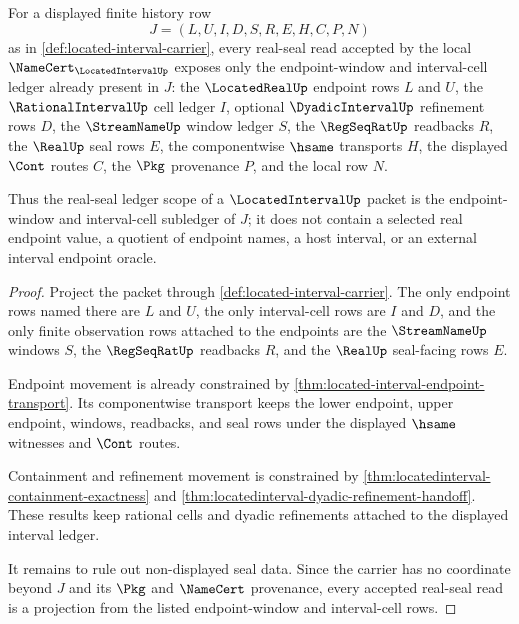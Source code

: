 \begin{theorem}
\label{thm:locatedinterval-real-seal-ledger-scope}
For a displayed finite history row
$$
J=(L,U,I,D,S,R,E,H,C,P,N)
$$
as in \autoref{def:located-interval-carrier}, every real-seal read accepted by the local $\NameCert_{\LocatedIntervalUp}$ exposes only the endpoint-window and interval-cell ledger already present in $J$: the $\LocatedRealUp$ endpoint rows $L$ and $U$, the $\RationalIntervalUp$ cell ledger $I$, optional $\DyadicIntervalUp$ refinement rows $D$, the $\StreamNameUp$ window ledger $S$, the $\RegSeqRatUp$ readbacks $R$, the $\RealUp$ seal rows $E$, the componentwise $\hsame$ transports $H$, the displayed $\Cont$ routes $C$, the $\Pkg$ provenance $P$, and the local row $N$.

Thus the real-seal ledger scope of a $\LocatedIntervalUp$ packet is the endpoint-window and interval-cell subledger of $J$; it does not contain a selected real endpoint value, a quotient of endpoint names, a host interval, or an external interval endpoint oracle.
\end{theorem}
\begin{proof}
Project the packet through \autoref{def:located-interval-carrier}. The only endpoint rows named there are $L$ and $U$, the only interval-cell rows are $I$ and $D$, and the only finite observation rows attached to the endpoints are the $\StreamNameUp$ windows $S$, the $\RegSeqRatUp$ readbacks $R$, and the $\RealUp$ seal-facing rows $E$.

Endpoint movement is already constrained by \autoref{thm:located-interval-endpoint-transport}. Its componentwise transport keeps the lower endpoint, upper endpoint, windows, readbacks, and seal rows under the displayed $\hsame$ witnesses and $\Cont$ routes.

Containment and refinement movement is constrained by \autoref{thm:locatedinterval-containment-exactness} and \autoref{thm:locatedinterval-dyadic-refinement-handoff}. These results keep rational cells and dyadic refinements attached to the displayed interval ledger.

It remains to rule out non-displayed seal data. Since the carrier has no coordinate beyond $J$ and its $\Pkg$ and $\NameCert$ provenance, every accepted real-seal read is a projection from the listed endpoint-window and interval-cell rows.
\end{proof}

